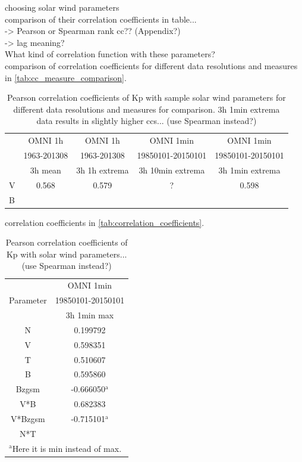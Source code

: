 choosing solar wind parameters\\
	comparison of their correlation coefficients in table...\\
		-> Pearson or Spearman rank cc?? (Appendix?)\\
		-> lag meaning?\\
	
What kind of correlation function with these parameters?\\

comparison of correlation coefficients for different data resolutions and measures in \autoref{tab:cc_measure_comparison}.
\begin{table}[htb]\small
	\centering
	\captionsetup{belowskip=4pt}
	\caption{Pearson correlation coefficients of Kp with sample solar wind parameters for different data resolutions and measures for comparison. 3h 1min extrema data results in slightly higher ccs... (use Spearman instead?)}
	\begin{tabular}{lcccc}
		\toprule
			&OMNI 1h	&OMNI 1h	&OMNI 1min	&OMNI 1min\\
			&1963-201308	&1963-201308	&19850101-20150101	&19850101-20150101\\
			&3h mean	&3h 1h extrema	&3h 10min extrema	&3h 1min extrema\\
		\midrule
		V	&0.568	&0.579	&?	&0.598\\
		B	&	&	&	&\\
		\bottomrule
	\end{tabular}
	\label{tab:cc_measure_comparison}
\end{table}


correlation coefficients in \autoref{tab:correlation_coefficients}.
\begin{table}[htb]\small
	\centering
	\captionsetup{belowskip=4pt}
	\caption{Pearson correlation coefficients of Kp with solar wind parameters... (use Spearman instead?)}
	\begin{tabular}{cc}
		\toprule
			&OMNI 1min\\
		Parameter	&19850101-20150101\\
			&3h 1min max\\
		\midrule
		N	&0.199792\\
		V	&0.598351\\
		T	&0.510607\\
		B	&0.595860\\
		Bzgsm	&-0.666050$^\text{a}$\\
		V*B	&0.682383\\
		V*Bzgsm	&-0.715101$^\text{a}$\\
		N*T	&\\
		\bottomrule
		\multicolumn{2}{l}{\footnotesize{$^\text{a}$Here it is min instead of max.}}
	\end{tabular}
	\label{tab:correlation_coefficients}
\end{table}



